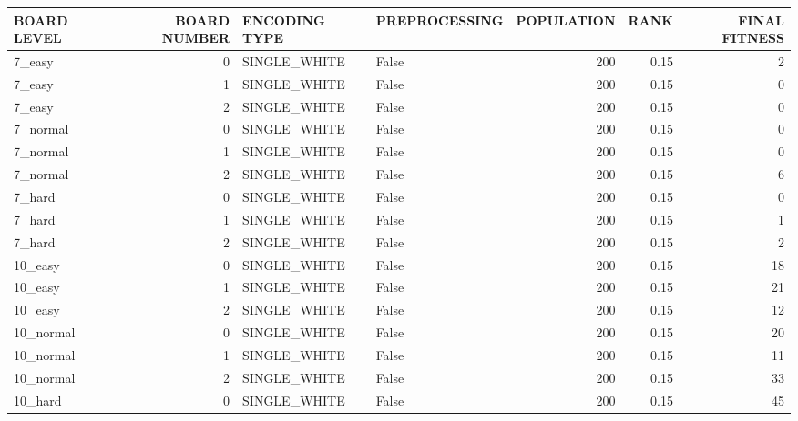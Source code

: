 \begin{tabular}{lrllrrr}
\hline
 BOARD LEVEL   &   BOARD NUMBER & ENCODING TYPE   & PREPROCESSING   &   POPULATION &   RANK &   FINAL FITNESS \\
\hline
 7\_easy        &              0 & SINGLE\_WHITE    & False           &          200 &   0.15 &               2 \\
 7\_easy        &              1 & SINGLE\_WHITE    & False           &          200 &   0.15 &               0 \\
 7\_easy        &              2 & SINGLE\_WHITE    & False           &          200 &   0.15 &               0 \\
 7\_normal      &              0 & SINGLE\_WHITE    & False           &          200 &   0.15 &               0 \\
 7\_normal      &              1 & SINGLE\_WHITE    & False           &          200 &   0.15 &               0 \\
 7\_normal      &              2 & SINGLE\_WHITE    & False           &          200 &   0.15 &               6 \\
 7\_hard        &              0 & SINGLE\_WHITE    & False           &          200 &   0.15 &               0 \\
 7\_hard        &              1 & SINGLE\_WHITE    & False           &          200 &   0.15 &               1 \\
 7\_hard        &              2 & SINGLE\_WHITE    & False           &          200 &   0.15 &               2 \\
 10\_easy       &              0 & SINGLE\_WHITE    & False           &          200 &   0.15 &              18 \\
 10\_easy       &              1 & SINGLE\_WHITE    & False           &          200 &   0.15 &              21 \\
 10\_easy       &              2 & SINGLE\_WHITE    & False           &          200 &   0.15 &              12 \\
 10\_normal     &              0 & SINGLE\_WHITE    & False           &          200 &   0.15 &              20 \\
 10\_normal     &              1 & SINGLE\_WHITE    & False           &          200 &   0.15 &              11 \\
 10\_normal     &              2 & SINGLE\_WHITE    & False           &          200 &   0.15 &              33 \\
 10\_hard       &              0 & SINGLE\_WHITE    & False           &          200 &   0.15 &              45 \\

\end{tabular}
